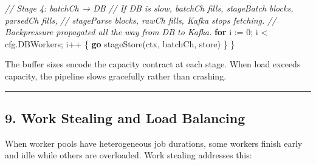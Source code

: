 \documentclass[
]{article}
\newenvironment{Shaded}{}{}
\newcommand{\CommentTok}[1]{\textcolor[rgb]{0.38,0.63,0.69}{\textit{#1}}}
\newcommand{\ControlFlowTok}[1]{\textcolor[rgb]{0.00,0.44,0.13}{\textbf{#1}}}
\newcommand{\DecValTok}[1]{\textcolor[rgb]{0.25,0.63,0.44}{#1}}
\newcommand{\NormalTok}[1]{#1}
\newcommand{\OperatorTok}[1]{\textcolor[rgb]{0.40,0.40,0.40}{#1}}
\begin{document}
\begin{Shaded}
\begin{Highlighting}[]
    \CommentTok{// Stage 4: batchCh → DB}
    \CommentTok{// If DB is slow, batchCh fills, stageBatch blocks, parsedCh fills,}
    \CommentTok{// stageParse blocks, rawCh fills, Kafka stops fetching.}
    \CommentTok{// Backpressure propagated all the way from DB to Kafka.}
    \ControlFlowTok{for}\NormalTok{ i }\OperatorTok{:=} \DecValTok{0}\OperatorTok{;}\NormalTok{ i }\OperatorTok{\textless{}}\NormalTok{ cfg}\OperatorTok{.}\NormalTok{DBWorkers}\OperatorTok{;}\NormalTok{ i}\OperatorTok{++} \OperatorTok{\{}
        \ControlFlowTok{go}\NormalTok{ stageStore}\OperatorTok{(}\NormalTok{ctx}\OperatorTok{,}\NormalTok{ batchCh}\OperatorTok{,}\NormalTok{ store}\OperatorTok{)}
    \OperatorTok{\}}
\OperatorTok{\}}
\end{Highlighting}
\end{Shaded}

The buffer sizes encode the capacity contract at each stage. When load
exceeds capacity, the pipeline slows gracefully rather than crashing.

\begin{center}\rule{0.5\linewidth}{0.5pt}\end{center}

\hypertarget{work-stealing-and-load-balancing}{%
\subsection{9. Work Stealing and Load
Balancing}\label{work-stealing-and-load-balancing}}

When worker pools have heterogeneous job durations, some workers finish
early and idle while others are overloaded. Work stealing addresses
this:
\end{document}
